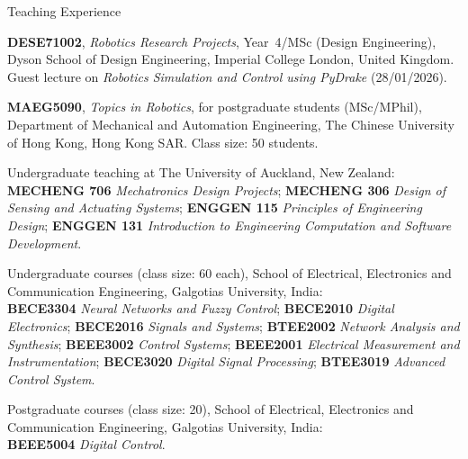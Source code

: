 
\begin{rubric}{Teaching Experience}

\entry*[2026]%
    \textbf{DESE71002}, \textit{Robotics Research Projects}, Year~4/MSc (Design Engineering), Dyson School of Design Engineering, Imperial College London, United Kingdom.
    \\ Guest lecture on \textit{Robotics Simulation and Control using PyDrake} (28/01/2026).

\entry*[2021 -- 2024]%
    \textbf{MAEG5090}, \textit{Topics in Robotics}, for postgraduate students (MSc/MPhil), Department of Mechanical and Automation Engineering, The Chinese University of Hong Kong, Hong Kong SAR. Class size: 50 students.

\entry*[2017 -- 2020]%
    Undergraduate teaching at The University of Auckland, New Zealand:
    \\ \textbf{MECHENG 706} \textit{Mechatronics Design Projects};
    \textbf{MECHENG 306} \textit{Design of Sensing and Actuating Systems};
    \textbf{ENGGEN 115} \textit{Principles of Engineering Design};
    \textbf{ENGGEN 131} \textit{Introduction to Engineering Computation and Software Development}.

\entry*[2013 -- 2016]%
    Undergraduate courses (class size: 60 each), School of Electrical, Electronics and Communication Engineering, Galgotias University, India:
    \\ \textbf{BECE3304} \textit{Neural Networks and Fuzzy Control};
    \textbf{BECE2010} \textit{Digital Electronics};
    \textbf{BECE2016} \textit{Signals and Systems};
    \textbf{BTEE2002} \textit{Network Analysis and Synthesis};
    \textbf{BEEE3002} \textit{Control Systems};
    \textbf{BEEE2001} \textit{Electrical Measurement and Instrumentation};
    \textbf{BECE3020} \textit{Digital Signal Processing};
    \textbf{BTEE3019} \textit{Advanced Control System}.

\entry*[2013 -- 2016]%
    Postgraduate courses (class size: 20), School of Electrical, Electronics and Communication Engineering, Galgotias University, India:
    \\ \textbf{BEEE5004} \textit{Digital Control}.

\end{rubric}

